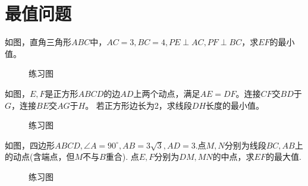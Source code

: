 \section{最值问题}
\begin{problem}
如图，直角三角形$ABC$中，$AC=3,BC=4,PE\perp AC,PF\perp BC$，求$EF$的最小值。
\end{problem}
\begin{figure}[H]
    \centering
    \resizebox{3cm}{!}{}
    \caption{练习图}
\end{figure}
\begin{problem}
如图，$E,F$是正方形$ABCD$的边$AD$上两个动点，满足$AE=DF$。连接$CF$交$BD$于$G$，连接$BE$交$AG$于$H$。
若正方形边长为2，求线段$DH$长度的最小值。
\end{problem}
\begin{figure}[H]
    \centering
    \resizebox{3cm}{!}{}
    \caption{练习图}
\end{figure}
\begin{problem}
如图，四边形$ABCD,\angle A=90^\circ,AB=3\sqrt3,AD=3$.点$M,N$分别为线段$BC,AB$上的动点(含端点，但$M$不与$B$重合).
点$E,F$分别为$DM,MN$的中点，求$EF$的最大值.
\end{problem}
\begin{figure}[H]
    \centering
    \resizebox{3cm}{!}{}
    \caption{练习图}
\end{figure}
\clearpage
